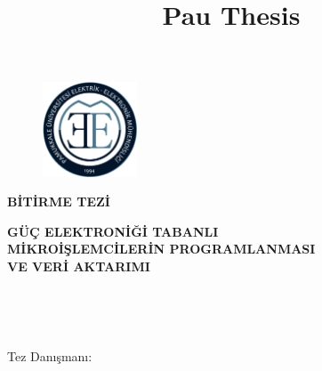 \documentclass[]{esogu}			%
\begin{document}
\frontmatter %
\title{Pau Thesis}
\begin{titlingpage*}
\begin{center}
\large
\textbf{\MakeUppercase{\uni}}

\vspace{1pc}
\textbf{\MakeUppercase{\fakulte}}

\vspace{1pc}
\textbf{\MakeUppercase{\bolum}}
\vspace{2pc}

	\begin{figure}[h]
	\centering
	\includegraphics[width=0.25\textwidth]{gorseller/image1}
	\end{figure}
	\vspace{2pc}
  \Large
	\textbf{\unvan\space BİTİRME TEZİ}\\
  \vspace{1pc}							%
  \normalsize
\end{center}
\begin{framed}
\begin{center}
\textbf{GÜÇ ELEKTRONİĞİ TABANLI \\MİKROİŞLEMCİLERİN PROGRAMLANMASI\\ VE VERİ AKTARIMI} %
\vspace{1pc}

\yazar\\
\vspace{1pc}

\teslim\\
\vspace{1pc}

Tez Danışmanı:\hspace{10mm} \danisman
\end{center}
\end{framed}
\end{titlingpage*}

\end{document}
